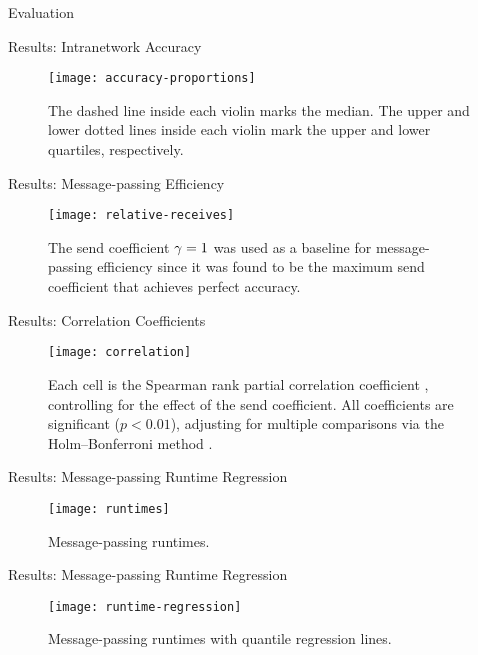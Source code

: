 \documentclass[11pt]{beamer}
\begin{document}
\begin{section}{Evaluation}
\begin{frame}{Results: Intranetwork Accuracy}
\begin{figure}
  \centering
  \texttt{[image: accuracy-proportions]}
  \caption[Intranetwork accuracy distributions]{The dashed line inside each violin marks the median. The upper and lower dotted lines inside each violin mark the upper and lower quartiles, respectively.}
\end{figure}
\end{frame}

\begin{frame}{Results: Message-passing Efficiency}
\begin{figure}
  \centering
  \texttt{[image: relative-receives]}
  \caption[Message-passing efficiency]{The send coefficient $\gamma = 1$ was used as a baseline for message-passing efficiency since it was found to be the maximum send coefficient that achieves perfect accuracy.}
\end{figure}
\end{frame}

\begin{frame}{Results: Correlation Coefficients}
\begin{figure}
  \centering
  \texttt{[image: correlation]}
  \caption[Correlation matrix of dataset attributes]{Each cell is the Spearman rank partial correlation coefficient \citep{Spearman1904}, controlling for the effect of the send coefficient. All coefficients are significant ($p < 0.01$), adjusting for multiple comparisons via the Holm–Bonferroni method \citep{Holm1979}.}
\end{figure}
\end{frame}

\begin{frame}{Results: Message-passing Runtime Regression}
\begin{figure}
  \centering
  \texttt{[image: runtimes]}
  \caption[Message-passing runtimes]{Message-passing runtimes.}
\end{figure}
\end{frame}

\begin{frame}{Results: Message-passing Runtime Regression}
\begin{figure}
  \centering
  \texttt{[image: runtime-regression]}
  \caption[Message-passing runtimes with regression lines]{Message-passing runtimes with quantile regression lines.}
\end{figure}
\end{frame}

\end{section}
\end{document}

